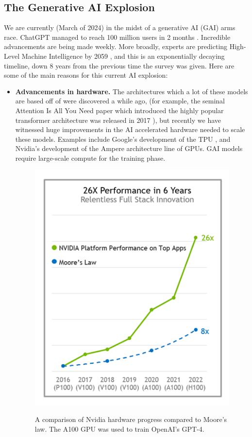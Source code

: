 \documentclass[12pt,a4paper]{article}
\begin{document}
\subsection{The Generative AI Explosion}
We are currently (March of 2024) in the midst of a generative AI (GAI) arms race. ChatGPT managed to reach 100 million users in 2 months \cite{gptstatistics}. Incredible advancements are being made weekly. More broadly, experts are predicting High-Level Machine Intelligence by 2059 \cite{aiimpacts}, and this is an exponentially decaying timeline, down 8 years from the previous time the survey was given. Here are some of the main reasons for this current AI explosion:
\begin{itemize}
    \item \textbf{Advancements in hardware.} The architectures which a lot of these models are based off of were discovered a while ago, (for example, the seminal Attention Is All You Need paper which introduced the highly popular transformer architecture was released in 2017 \cite{attention}), but recently we have witnessed huge improvements in the AI accelerated hardware needed to scale these models. Examples include Google's development of the TPU \cite{tpu}, and Nvidia's development of the Ampere architecture line of GPUs. GAI models require large-scale compute for the training phase. 
    \begin{figure}[H]
        \centering
        \includegraphics[scale=0.6]{nvidiaGraph.png}
        \cite{nvidia}
        \caption{A comparison of Nvidia hardware progress compared to Moore's law. The A100 GPU was used to train OpenAI's GPT-4. \cite{gpt4}}
    \end{figure}


\end{itemize}
\end{document}

